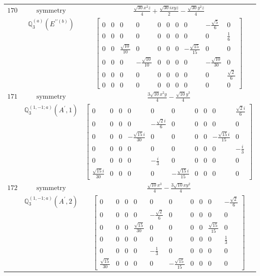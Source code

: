 \documentclass[fleqn,8pt,landscape]{jsarticle}
\begin{document}
\begin{longtable}{ccc}
$ 170 $ & $ \text{symmetry} $ & $ \frac{\sqrt{30} x^{2} z}{4} + \frac{\sqrt{30} i x y z}{2} - \frac{\sqrt{30} y^{2} z}{4} $ \\
$  $ & $ \mathbb{Q}_{3}^{(a)}(E^{\prime\prime(b)}) $ & $ \begin{bmatrix} 0 & 0 & 0 & 0 & 0 & 0 & 0 & 0 & - \frac{\sqrt{5}}{6} & 0 \\ 0 & 0 & 0 & 0 & 0 & 0 & 0 & 0 & 0 & \frac{1}{6} \\ 0 & 0 & \frac{\sqrt{10}}{10} & 0 & 0 & 0 & 0 & - \frac{\sqrt{15}}{15} & 0 & 0 \\ 0 & 0 & 0 & - \frac{\sqrt{10}}{10} & 0 & 0 & 0 & 0 & - \frac{\sqrt{10}}{30} & 0 \\ 0 & 0 & 0 & 0 & 0 & 0 & 0 & 0 & 0 & \frac{\sqrt{2}}{6} \\ 0 & 0 & 0 & 0 & 0 & 0 & 0 & 0 & 0 & 0 \end{bmatrix} $ \\ \hline
$ 171 $ & $ \text{symmetry} $ & $ \frac{3 \sqrt{10} x^{2} y}{4} - \frac{\sqrt{10} y^{3}}{4} $ \\
$  $ & $ \mathbb{Q}_{3}^{(1,-1;a)}(A^{\prime},1) $ & $ \begin{bmatrix} 0 & 0 & 0 & 0 & 0 & 0 & 0 & 0 & 0 & \frac{\sqrt{2} i}{6} \\ 0 & 0 & 0 & 0 & - \frac{\sqrt{2} i}{6} & 0 & 0 & 0 & 0 & 0 \\ 0 & 0 & 0 & - \frac{\sqrt{15} i}{30} & 0 & 0 & 0 & 0 & - \frac{\sqrt{15} i}{15} & 0 \\ 0 & 0 & 0 & 0 & 0 & 0 & 0 & 0 & 0 & - \frac{i}{3} \\ 0 & 0 & 0 & 0 & - \frac{i}{3} & 0 & 0 & 0 & 0 & 0 \\ \frac{\sqrt{15} i}{30} & 0 & 0 & 0 & 0 & - \frac{\sqrt{15} i}{15} & 0 & 0 & 0 & 0 \end{bmatrix} $ \\ \hline
$ 172 $ & $ \text{symmetry} $ & $ \frac{\sqrt{10} x^{3}}{4} - \frac{3 \sqrt{10} x y^{2}}{4} $ \\
$  $ & $ \mathbb{Q}_{3}^{(1,-1;a)}(A^{\prime},2) $ & $ \begin{bmatrix} 0 & 0 & 0 & 0 & 0 & 0 & 0 & 0 & 0 & - \frac{\sqrt{2}}{6} \\ 0 & 0 & 0 & 0 & - \frac{\sqrt{2}}{6} & 0 & 0 & 0 & 0 & 0 \\ 0 & 0 & 0 & \frac{\sqrt{15}}{30} & 0 & 0 & 0 & 0 & \frac{\sqrt{15}}{15} & 0 \\ 0 & 0 & 0 & 0 & 0 & 0 & 0 & 0 & 0 & \frac{1}{3} \\ 0 & 0 & 0 & 0 & - \frac{1}{3} & 0 & 0 & 0 & 0 & 0 \\ \frac{\sqrt{15}}{30} & 0 & 0 & 0 & 0 & - \frac{\sqrt{15}}{15} & 0 & 0 & 0 & 0 \end{bmatrix} $ \\ \hline

\end{longtable}
\end{document}
